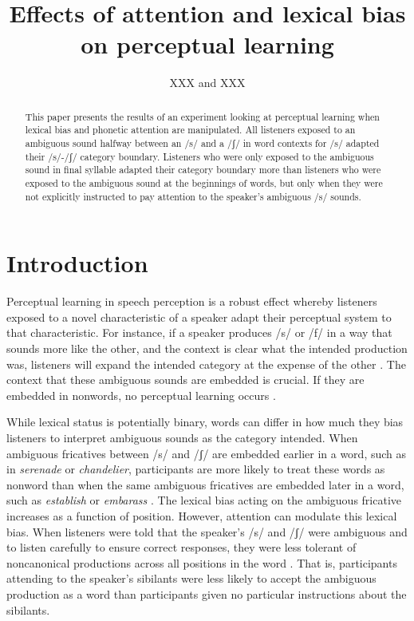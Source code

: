 \documentclass[a4paper,11pt,twocolumn]{article}
\title{Effects of attention and lexical bias on perceptual learning}
\author{XXX and XXX}
\begin{document}
\maketitle

\begin{abstract}
This paper presents the results of an experiment looking at perceptual learning when lexical bias and phonetic attention are manipulated.  All listeners exposed to an ambiguous sound halfway between an /s/ and a /ʃ/ in word contexts for /s/ adapted their /s/-/ʃ/ category boundary.  Listeners who were only exposed to the ambiguous sound in final syllable adapted their category boundary more than listeners who were exposed to the ambiguous sound at the beginnings of words, but only when they were not explicitly instructed to pay attention to the speaker's ambiguous /s/ sounds.  
\end{abstract}



\section{Introduction}

Perceptual learning in speech perception is a robust effect whereby listeners exposed to a novel characteristic of a speaker adapt their perceptual system to that characteristic.  For instance, if a speaker produces /s/ or /f/ in a way that sounds more like the other, and the context is clear what the intended production was, listeners will expand the intended category at the expense of the other \cite{Norris2003, Reinisch2013}.  The context that these ambiguous sounds are embedded is crucial.  If they are embedded in nonwords, no perceptual learning occurs \cite{Norris2003}. 

While lexical status is potentially binary, words can differ in how much they bias listeners to interpret ambiguous sounds as the category intended.  When ambiguous fricatives between /s/ and /ʃ/ are embedded earlier in a word, such as in \emph{serenade} or \emph{chandelier}, participants are more likely to treat these words as nonword than when the same ambiguous fricatives are embedded later in a word, such as \emph{establish} or \emph{embarass} \cite{Pitt2012}.  The lexical bias acting on the ambiguous fricative increases as a function of position.  However, attention can modulate this lexical bias.  When listeners were told that the speaker's /s/ and /ʃ/ were ambiguous and to listen carefully to ensure correct responses, they were less tolerant of noncanonical productions across all positions in the word \cite{Pitt2012}.  That is, participants attending to the speaker's sibilants were less likely to accept the ambiguous production as a word than participants given no particular instructions about the sibilants.
\end{document}
